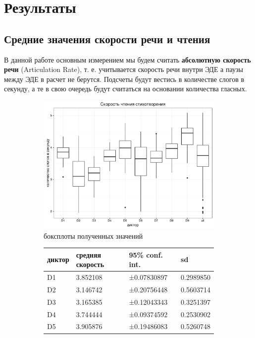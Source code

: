 \section{Результаты}
\subsection{Средние значения скорости речи и чтения}
\noindent В данной работе основным измерением мы будем считать \textbf{абсолютную скорость речи} (Articulation Rate), т. е. учитывается скорость речи внутри ЭДЕ а паузы между ЭДЕ в расчет не берутся. Подсчеты будут вестись в количестве слогов в секунду, а те в свою очередь будут считаться на основании количества гласных.
\begin{figure}[t]
\begin{subfigure}[b]{0.53\textwidth}
        \includegraphics[width=\linewidth]{verseboxplot.pdf}
        \caption{боксплоты полученных значений}
\end{subfigure}
\hfill
\begin{subfigure}[b]{0.45\textwidth}
\small
\begin{tabular}{|l|l|l|l|}
\hline
диктор & средняя скорость & 95\% conf. int. & sd \\ \hline
D1 & 3.852108 & ±0.07830897 & 0.2989850 \\ \hline
D2 & 3.146742 & ±0.20756448 & 0.5603714 \\ \hline
D3 & 3.165385 & ±0.12043343 & 0.3251397 \\ \hline
D4 & 3.744444 & ±0.09374592 & 0.2530902 \\ \hline
D5 & 3.905876 & ±0.19486083 & 0.5260748 \\ \hline

\end{tabular}
\end{subfigure}
\end{figure}
